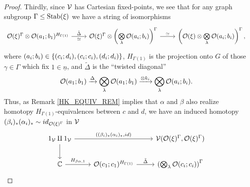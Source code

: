 \documentclass[a4paper,10pt
,draft
]{article}%
\renewcommand{\1}{\ensuremath{\mathbb{id}}}
\begin{document}
\begin{proof}
      Thirdly, since $\mathcal V$ has Cartesian fixed-points, we see that for any graph subgroup $\Gamma \leq \mathrm{Stab}(\xi)$
      we have a string of isomorphisms
      \begin{equation}
            \label{CART_FIXED_AB_EQ}
            \begin{tikzcd}
                  \O(\ksi)^\Gamma \otimes \O(a_1;b_1)^{H_{\Gamma(1)}}
                  \arrow[r, "\tilde\Delta", "\simeq"']
                  &
                  \O(\ksi)^\Gamma \otimes \left(
                        \bigotimes\limits_\lambda \O(a_i; b_i)
                  \right)^\Gamma
                  \arrow[r, "\simeq"]
                  &
                  \left(
                        \O(\ksi) \otimes \bigotimes\limits_\lambda \O(a_i;b_i)
                  \right)^\Gamma,
            \end{tikzcd}
      \end{equation}
      where
      $(a_i;b_i) \in \left\{(c_i;d_i), (c_i;c_i), (d_i;d_i)\right\}$,
      $H_{\Gamma(1)}$ is the projection onto $G$ of those $\gamma \in \Gamma$ which fix $1 \in \underline{n}$,
      and $\tilde\Delta$ is the ``twisted diagonal''
      \begin{equation}
            \mathcal{O}(a_1;b_1) \xrightarrow{\Delta} \bigotimes_\lambda \mathcal{O}(a_1;b_1) \xrightarrow{\otimes k_i} \bigotimes_\lambda \mathcal{O}(a_i;b_i).
      \end{equation}
      Thus, as Remark \ref{HK_EQUIV_REM} implies that $\alpha$ and $\beta$ also realize homotopy $H_{\Gamma(1)}$-equivalences between $c$ and $d$,
      we have an induced homotopy $(\beta_i)_{\**}(\alpha_i)_{\**} \sim id_{\O(\ksi)^\Gamma}$ in $\mathcal V$
      \begin{equation}
            \begin{tikzcd}
                  1_\V \amalg 1_\V \arrow[rr, "{((\beta_i)_{\**}(\alpha_i)_{\**}, id)}"] \arrow[d]
                  &&
                  \V(\O(\ksi)^\Gamma, \O(\ksi)^\Gamma)
                  \\
                  \mathbb C \arrow[r, "H_{\beta\alpha,1}"]
                  &
                  \O(c_1;c_1)^{H_{\Gamma(1)}} \arrow[r, "\tilde\Delta"]
                  &
                  \left(
                        \bigotimes_\lambda \O(c_i;c_i)
                  \right)^\Gamma

\end{tikzcd}
\end{equation}
\end{proof}
\end{document}
